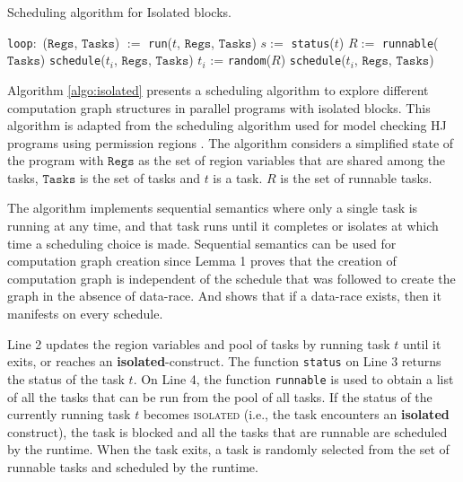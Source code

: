 \begin{algorithm}
\caption{Scheduling algorithm for Isolated blocks.} \label{algo:isolated}
\begin{algorithmic}[1]
  \State \texttt{loop}:\ ($\mathtt{Regs}$, $\mathtt{Tasks}$) $:=$ \texttt{run}($t$, $\mathtt{Regs}$, $\mathtt{Tasks}$)\label{loc:run}
  \State $s :=$ \texttt{status}($t$)
  \State $R :=$ \texttt{runnable}($\mathtt{Tasks}$)
  \label{loc:entry:isolated}
  \label{loc:prsched}
  \State \texttt{schedule}($t_i$, $\mathtt{Regs}$, $\mathtt{Tasks}$)
  \EndFor
  \Else
  \State $t_i$ := \texttt{random}($R$)\label{loc:rand}
  \State \texttt{schedule}($t_i$, $\mathtt{Regs}$, $\mathtt{Tasks}$)
  \EndIf
  \EndFunction
\end{algorithmic}
\end{algorithm}

Algorithm \ref{algo:isolated} presents a scheduling algorithm to explore different computation graph structures in parallel programs with isolated blocks. This algorithm is adapted from the scheduling algorithm used for model checking HJ programs using permission regions \cite{mercer2015model}. The algorithm considers a simplified state of the program with $\mathtt{Regs}$ as the set of region variables that are shared among the tasks, $\mathtt{Tasks}$ is the set of tasks and $t$ is a task. $R$ is the set of runnable tasks. 

The algorithm implements sequential semantics where only a single task is running at any time, and that task runs until it completes or isolates at which time a scheduling choice is made. Sequential semantics can be used for computation graph creation since Lemma 1 proves that the creation of computation graph is independent of the schedule that was followed to create the graph in the absence of data-race. And  shows that if a data-race exists, then it manifests on every schedule. 

Line 2 updates the region variables and pool of tasks by running task $t$ until it exits, or reaches an \textbf{isolated}-construct. The function \texttt{status} on Line 3 returns the status of the task $t$. On Line 4, the function \texttt{runnable} is used to obtain a list of all the tasks that can be run from the pool of all tasks. If the status of the currently running task $t$ becomes \textsc{isolated} (i.e., the task encounters an \textbf{isolated} construct), the task is blocked and all the tasks that are runnable are scheduled by the runtime. When the task exits, a task is randomly selected from the set of runnable tasks and scheduled by the runtime.

